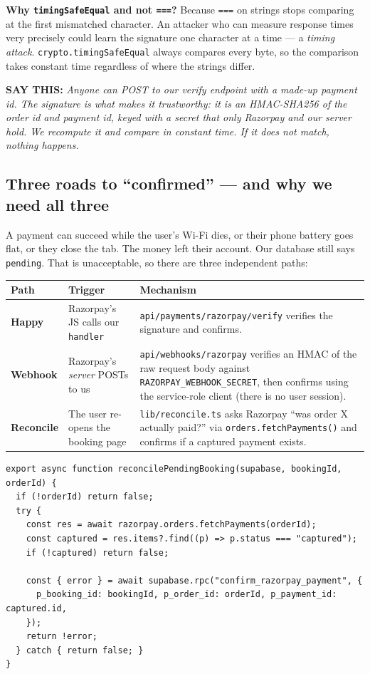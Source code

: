 \documentclass[11pt,a4paper]{article}
\newcommand{\saythis}[1]{\begin{saybox}\textbf{\small\color{primary}SAY THIS:} \textit{#1}\end{saybox}}
\newcommand{\file}[1]{\texttt{\small #1}}
\begin{document}
\begin{notebox}
\textbf{Why \texttt{timingSafeEqual} and not \texttt{===}?} Because \texttt{===}
on strings stops comparing at the first mismatched character. An attacker who can
measure response times very precisely could learn the signature one character at a
time --- a \emph{timing attack}. \texttt{crypto.timingSafeEqual} always compares
every byte, so the comparison takes constant time regardless of where the strings
differ.
\end{notebox}

\saythis{Anyone can POST to our verify endpoint with a made-up payment id. The
signature is what makes it trustworthy: it is an HMAC-SHA256 of the order id and
payment id, keyed with a secret that only Razorpay and our server hold. We
recompute it and compare in constant time. If it does not match, nothing happens.}

\subsection{Three roads to ``confirmed'' --- and why we need all three}

A payment can succeed while the user's Wi-Fi dies, or their phone battery goes
flat, or they close the tab. The money left their account. Our database still says
\texttt{pending}. That is unacceptable, so there are three independent paths:

\begin{longtable}{@{}p{2.5cm}p{4.1cm}p{8.2cm}@{}}
\toprule
\textbf{Path} & \textbf{Trigger} & \textbf{Mechanism} \\
\midrule
\endhead
\textbf{Happy} & Razorpay's JS calls our \texttt{handler} &
\file{api/payments/razorpay/verify} verifies the signature and confirms. \\
\addlinespace
\textbf{Webhook} & Razorpay's \emph{server} POSTs to us &
\file{api/webhooks/razorpay} verifies an HMAC of the raw request body against
\texttt{RAZORPAY\_WEBHOOK\_SECRET}, then confirms using the service-role client
(there is no user session). \\
\addlinespace
\textbf{Reconcile} & The user re-opens the booking page &
\file{lib/reconcile.ts} asks Razorpay ``was order X actually paid?'' via
\texttt{orders.fetchPayments()} and confirms if a captured payment exists. \\
\bottomrule
\end{longtable}

\begin{lstlisting}[language=TS,caption={lib/reconcile.ts --- the webhook-free safety net}]
export async function reconcilePendingBooking(supabase, bookingId, orderId) {
  if (!orderId) return false;
  try {
    const res = await razorpay.orders.fetchPayments(orderId);
    const captured = res.items?.find((p) => p.status === "captured");
    if (!captured) return false;

    const { error } = await supabase.rpc("confirm_razorpay_payment", {
      p_booking_id: bookingId, p_order_id: orderId, p_payment_id: captured.id,
    });
    return !error;
  } catch { return false; }
}
\end{lstlisting}
\end{document}
